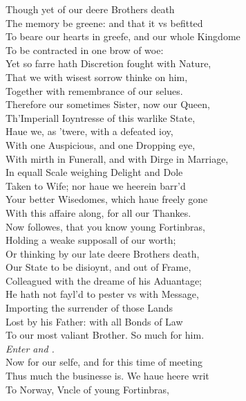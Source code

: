 \documentclass[a5paper,DIV=calc,11pt]{scrbook}
\begin{document}
\begin{drama*}
    \kingspeaks Though yet of \ham our deere Brothers death\\
    The memory be greene: and that it vs befitted\\
    To beare our hearts in greefe, and our whole Kingdome\\
    To be contracted in one brow of woe:\\
    Yet so farre hath Discretion fought with Nature,\\
    That we with wisest sorrow thinke on him,\\
    Together with remembrance of our selues.\\
    Therefore our sometimes Sister, now our Queen,\\
    Th'Imperiall Ioyntresse of this warlike State,\\
    Haue we, as 'twere, with a defeated ioy,\\
    With one Auspicious, and one Dropping eye,\\
    With mirth in Funerall, and with Dirge in Marriage,\\
    In equall Scale weighing Delight and Dole\\
    Taken to Wife; nor haue we heerein barr'd\\
    Your better Wisedomes, which haue freely gone\\
    With this affaire along, for all our Thankes.\\
    Now followes, that you know young Fortinbras,\\
    Holding a weake supposall of our worth;\\
    Or thinking by our late deere Brothers death,\\
    Our State to be disioynt, and out of Frame,\\
    Colleagued with the dreame of his Aduantage;\\
    He hath not fayl'd to pester vs with Message,\\
    Importing the surrender of those Lands\\
    Lost by his Father: with all Bonds of Law\\
    To our most valiant Brother. So much for him.\\
    \textit{Enter \volt and \corn.}\\
    Now for our selfe, and for this time of meeting\\
    Thus much the businesse is. We haue heere writ\\
    To Norway, Vncle of young Fortinbras,\\

\end{drama*}
\end{document}
